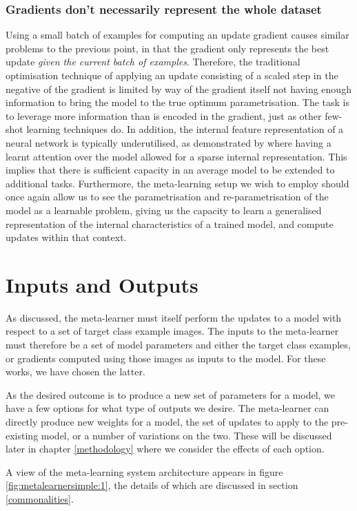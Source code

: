 \documentclass{report}
\begin{document}
\subsubsection{Gradients don't necessarily represent the whole dataset}
Using a small batch of examples for computing an update gradient causes similar problems to the previous point, in that the gradient only represents the best update \textit{given the current batch of examples}. Therefore, the traditional optimisation technique of applying an update consisting of a scaled step in the negative of the gradient is limited by way of the gradient itself not having enough information to bring the model to the true optimum parametrisation. The task is to leverage more information than is encoded in the gradient, just as other few-shot learning techniques do. In addition, the internal feature representation of a neural network is typically underutilised, as demonstrated by \parencite{hat} where having a learnt attention over the model allowed for a sparse internal representation. This implies that there is sufficient capacity in an average model to be extended to additional tasks. Furthermore, the meta-learning setup we wish to employ should once again allow us to see the parametrisation and re-parametrisation of the model as a learnable problem, giving us the capacity to learn a generalised representation of the internal characteristics of a trained model, and compute updates within that context. \par

\section{Inputs and Outputs}
As discussed, the meta-learner must itself perform the updates to a model with respect to a set of target class example images. The inputs to the meta-learner must therefore be a set of model parameters and either the target class examples, or gradients computed using those images as inputs to the model. For these works, we have chosen the latter. \par
As the desired outcome is to produce a new set of parameters for a model, we have a few options for what type of outputs we desire. The meta-learner can directly produce new weights for a model, the set of updates to apply to the pre-existing model, or a number of variations on the two. These will be discussed later in chapter \ref{methodology} where we consider the effects of each option. \par
A  view of the meta-learning system architecture appears in figure \ref{fig:metalearnersimple:1}, the details of which are discussed in section \ref{commonalities}.
\end{document}
